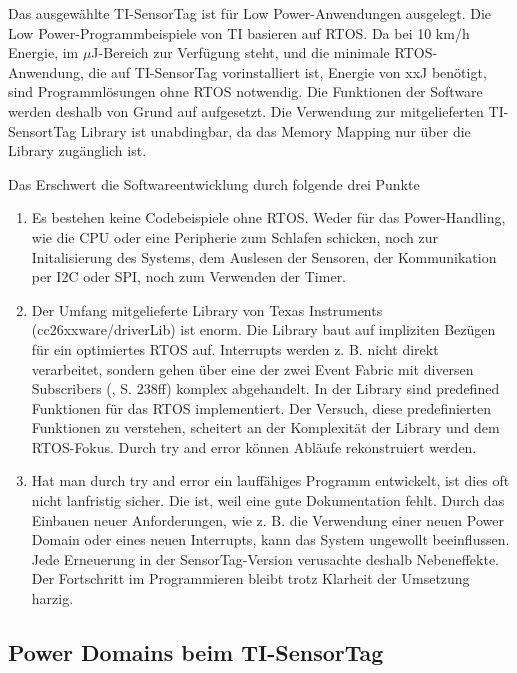 Das ausgewählte TI-SensorTag ist für Low Power-Anwendungen ausgelegt. Die Low Power-Programmbeispiele von TI basieren auf RTOS. Da bei 10 km/h Energie, im $\mu$J-Bereich zur Verfügung steht, und die minimale RTOS-Anwendung, die auf TI-SensorTag vorinstalliert ist, Energie von xxJ benötigt, sind Programmlösungen ohne RTOS notwendig. Die Funktionen der Software werden deshalb von Grund auf aufgesetzt. Die Verwendung zur mitgelieferten TI-SensortTag Library ist unabdingbar, da das Memory Mapping nur über die Library zugänglich ist. 


Das Erschwert die Softwareentwicklung durch folgende drei Punkte

\begin{enumerate}
    \item Es bestehen keine Codebeispiele ohne RTOS. Weder für das Power-Handling, wie die CPU oder eine Peripherie zum Schlafen schicken, noch zur Initalisierung des Systems, dem Auslesen der Sensoren, der Kommunikation per I2C oder SPI, noch zum Verwenden der Timer.
    \item Der Umfang mitgelieferte Library von Texas Instruments (cc26xxware/driverLib) ist enorm. Die Library baut auf impliziten Bezügen für ein optimiertes RTOS auf. Interrupts werden z. B. nicht direkt verarbeitet, sondern gehen über eine der zwei Event Fabric mit diversen Subscribers (\cite{Sensortag_Manual}, S. 238ff) komplex abgehandelt. In der Library sind predefined Funktionen für das RTOS implementiert. Der Versuch, diese predefinierten Funktionen zu verstehen, scheitert an der Komplexität der Library und dem RTOS-Fokus. Durch try and error können Abläufe rekonstruiert werden.
   \item Hat man durch try and error ein lauffähiges Programm entwickelt, ist dies oft nicht lanfristig sicher. Die ist, weil eine gute Dokumentation fehlt. Durch das Einbauen neuer Anforderungen, wie z. B. die Verwendung einer neuen Power Domain oder eines neuen Interrupts, kann das System ungewollt beeinflussen. Jede Erneuerung in der SensorTag-Version verusachte deshalb Nebeneffekte. Der Fortschritt im Programmieren bleibt trotz Klarheit der Umsetzung harzig.
\end{enumerate}

\subsection{Power Domains beim TI-SensorTag}
\label{PowerDomains}


